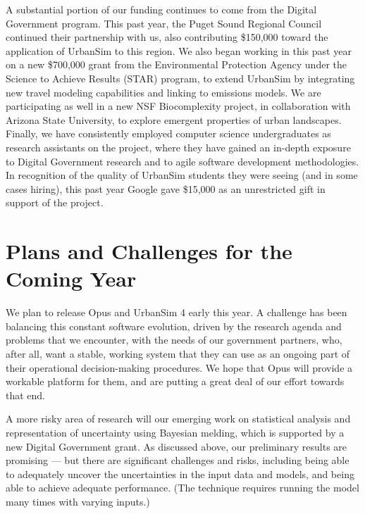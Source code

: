 \documentclass{acm_proc_article-sp}
\begin{document}
A substantial portion of our funding continues to come from the
Digital Government program.  This past year, the Puget Sound
Regional Council continued their partnership with us, also
contributing \$150,000 toward the application of UrbanSim to this
region. We also began working in this past year on a new \$700,000
grant from the Environmental Protection Agency under the Science
to Achieve Results (STAR) program, to extend UrbanSim by
integrating new travel modeling capabilities and linking to
emissions models. We are participating as well in a new NSF
Biocomplexity project, in collaboration with Arizona State
University, to explore emergent properties of urban landscapes.
Finally, we have consistently employed computer science
undergraduates as research assistants on the project, where they
have gained an in-depth exposure to Digital Government research
and to agile software development methodologies.  In recognition
of the quality of UrbanSim students they were seeing (and in some
cases hiring), this past year Google gave \$15,000 as an
unrestricted gift in support of the project.

\section{Plans and Challenges for the Coming Year}

We plan to release Opus and UrbanSim 4 early this year.  A
challenge has been balancing this constant software evolution,
driven by the research agenda and problems that we encounter, with
the needs of our government partners, who, after all, want a
stable, working system that they can use as an ongoing part of
their operational decision-making procedures. We hope that Opus
will provide a workable platform for them, and are putting a great
deal of our effort towards that end.

A more risky area of research will our emerging work on
statistical analysis and representation of uncertainty using
Bayesian melding, which is supported by a new Digital Government
grant.  As discussed above, our preliminary results are promising
--- but there are significant challenges and risks, including
being able to adequately uncover the uncertainties in the input
data and models, and being able to achieve adequate performance.
(The technique requires running the model many times with varying
inputs.)
\end{document}
